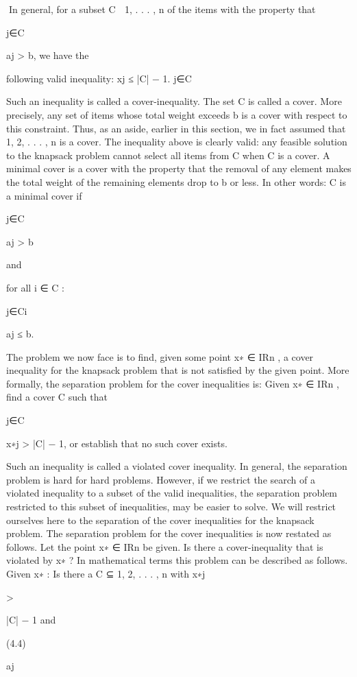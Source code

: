 \documentclass[titlepage]{book}
\theoremstyle{plain}
\theoremstyle{definition}
\theoremstyle{remark}
\begin{document}
In general, for a subset C ⊆ {1, . . . , n} of the items with the property that

j∈C

aj > b, we have the

following valid inequality:
xj ≤ |C| − 1.
j∈C

Such an inequality is called a cover-inequality. The set C is called a cover. More precisely, any set of
items whose total weight exceeds b is a cover with respect to this constraint. Thus, as an aside, earlier in
this section, we in fact assumed that {1, 2, . . . , n} is a cover. The inequality above is clearly valid: any
feasible solution to the knapsack problem cannot select all items from C when C is a cover. A minimal
cover is a cover with the property that the removal of any element makes the total weight of the remaining
elements drop to b or less. In other words: C is a minimal cover if

j∈C

aj > b

and

for all i ∈ C :

j∈C{i}

aj ≤ b.

The problem we now face is to find, given some point x∗ ∈ IRn , a cover inequality for the knapsack
problem that is not satisfied by the given point. More formally, the separation problem for the cover
inequalities is:
Given x∗ ∈ IRn , find a cover C such that

j∈C

x∗j > |C| − 1, or establish that no such cover exists.

Such an inequality is called a violated cover inequality. In general, the separation problem is hard for hard
problems. However, if we restrict the search of a violated inequality to a subset of the valid inequalities,
the separation problem restricted to this subset of inequalities, may be easier to solve. We will restrict
ourselves here to the separation of the cover inequalities for the knapsack problem.
The separation problem for the cover inequalities is now restated as follows. Let the point x∗ ∈ IRn be
given. Is there a cover-inequality that is violated by x∗ ? In mathematical terms this problem can be
described as follows.
Given x∗ : Is there a C ⊆ {1, 2, . . . , n} with
x∗j

>

|C| − 1 and

(4.4)

aj
\end{document}

